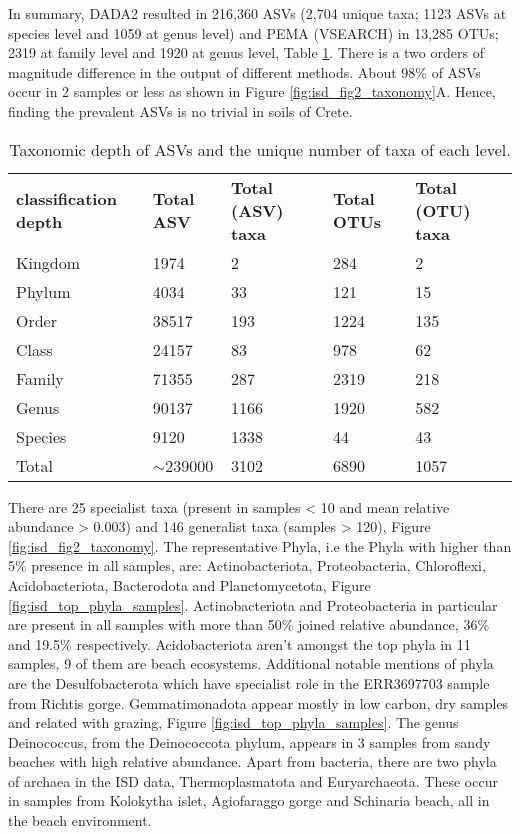 In summary, DADA2 resulted in 216,360 ASVs (2,704 unique
taxa; 1123 ASVs at species level and 1059 at genus level) and
PEMA (VSEARCH) in 13,285 OTUs; 2319 at family level and 1920 at genus level, Table \ref{table:asv_taxonomy}.
There is a two orders of magnitude difference in the output of different methods. 
About 98\% of ASVs occur in 2 samples or less as shown in Figure \ref{fig:isd_fig2_taxonomy}A.
Hence, finding the prevalent ASVs is no trivial in soils of Crete.

\begin{table}[]
    \caption{Taxonomic depth of ASVs and the unique number of taxa of each level.}%
\begin{tabular}{@{}lllll@{}}
    \textbf{classification depth} & \textbf{Total ASV}    & \textbf{Total (ASV) taxa} & \textbf{Total OTUs} & \textbf{Total (OTU) taxa}\\
Kingdom              & 1974         & 2                & 284        & 2               \\
Phylum               & 4034         & 33               & 121        & 15              \\
Order                & 38517        & 193              & 1224       & 135             \\
Class                & 24157        & 83               & 978        & 62              \\
Family               & 71355        & 287              & 2319       & 218             \\
Genus                & 90137        & 1166             & 1920       & 582             \\
Species              & 9120         & 1338             & 44         & 43              \\
Total                & $\sim$239000 & 3102             & 6890       & 1057            
\end{tabular}
\label{table:asv_taxonomy}
\end{table}

There are 25 specialist taxa (present in samples < 10 and mean relative
abundance > 0.003) and 146 generalist taxa (samples > 120), Figure \ref{fig:isd_fig2_taxonomy}.
The representative Phyla, i.e the Phyla with higher than 5\% presence in all samples, are:
Actinobacteriota, Proteobacteria, Chloroflexi, Acidobacteriota,
Bacterodota and Planctomycetota, Figure \ref{fig:isd_top_phyla_samples}.
Actinobacteriota and Proteobacteria in particular are present in all samples with 
more than 50\% joined relative abundance, 36\% and 19.5\% respectively.
Acidobacteriota aren't amongst the top phyla in 11 samples, 9 of them are beach
ecosystems.
Additional notable mentions of phyla are the Desulfobacterota which have specialist
role in the ERR3697703 sample from Richtis gorge. Gemmatimonadota appear mostly
in low carbon, dry samples and related with grazing, Figure \ref{fig:isd_top_phyla_samples}.
The genus Deinococcus,
from the Deinococcota phylum, appears in 3 samples from sandy beaches with high relative abundance.
Apart from bacteria, there are two phyla of archaea in the ISD data, Thermoplasmatota and Euryarchaeota.
These occur in samples from Kolokytha islet, Agiofaraggo gorge and Schinaria beach, all in the 
beach environment. 

